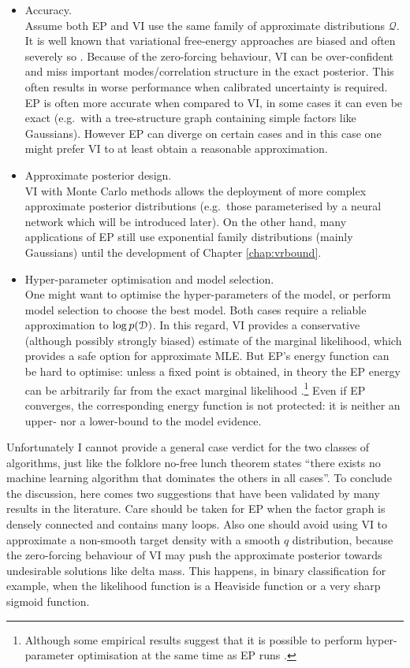 \begin{itemize}
\item Accuracy. \\
Assume both EP and VI use the same family of approximate distributions $\mathcal{Q}$. It is well known that variational free-energy approaches are biased and often severely so \citep{turner:two_problems2011}. Because of the zero-forcing behaviour, VI can be over-confident and miss important modes/correlation structure in the exact posterior. This often results in worse performance when calibrated uncertainty is required. EP is often more accurate when compared to VI, in some cases it can even be exact (e.g.~with a tree-structure graph containing simple factors like Gaussians). However EP can diverge on certain cases and in this case one might prefer VI to at least obtain a reasonable approximation.

\item Approximate posterior design. \\
VI with Monte Carlo methods allows the deployment of more complex approximate posterior distributions (e.g.~those parameterised by a neural network which will be introduced later). On the other hand, many applications of EP still use exponential family distributions (mainly Gaussians) until the development of Chapter \ref{chap:vrbound}.

\item Hyper-parameter optimisation and model selection. \\
One might want to optimise the hyper-parameters of the model, or perform model selection to choose the best model. Both cases require a reliable approximation to $\log p(\mathcal{D})$. In this regard, VI provides a conservative (although possibly strongly biased) estimate of the marginal likelihood, which provides a safe option for approximate MLE. But EP's energy function can be hard to optimise: unless a fixed point is obtained, in theory the EP energy can be arbitrarily far from the exact marginal likelihood \citep{cunningham:gaussianEP2011}.\footnote{Although some empirical results suggest that it is possible to perform hyper-parameter optimisation at the same time as EP runs \citep{hernandez-lobato:gp2016}.} Even if EP converges, the corresponding energy function is not protected: it is neither an upper- nor a lower-bound to the model evidence.

\end{itemize}

Unfortunately I cannot provide a general case verdict for the two classes of algorithms, just like the folklore no-free lunch theorem \citep{wolpert:no_free_lunch1997} states ``there exists no machine learning algorithm that dominates the others in all cases''. To conclude the discussion, here comes two suggestions that have been validated by many results in the literature. Care should be taken for EP when the factor graph is densely connected and contains many loops. Also one should avoid using VI to approximate a non-smooth target density with a smooth $q$ distribution, because the zero-forcing behaviour of VI may push the approximate posterior towards undesirable solutions like delta mass. This happens, in binary classification for example, when the likelihood function is a Heaviside function or a very sharp sigmoid function. 

